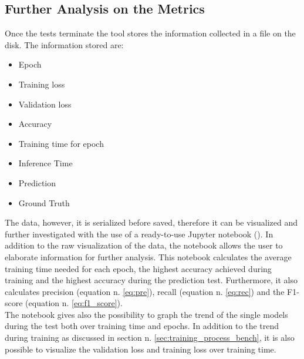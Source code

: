 \subsection{Further Analysis on the Metrics}
Once the tests terminate the tool stores the information collected in a file on the disk. The information stored are:
\begin{itemize}
\item Epoch
\item Training loss
\item Validation loss
\item Accuracy
\item Training time for epoch
\item Inference Time
\item Prediction
\item Ground Truth
\end{itemize}
The data, however, it is serialized before saved, therefore it can be visualized and further investigated with the use of a ready-to-use Jupyter notebook (\cite{Kluyver2016jupyter}). In addition to the raw visualization of the data, the notebook allows the user to elaborate information for further analysis. This notebook calculates the average training time needed for each epoch, the highest accuracy achieved during training and the highest accuracy during the prediction test.  Furthermore, it also calculates precision (equation n. \ref{eq:pre}), recall (equation n. \ref{eq:rec}) and the F1-score (equation n. \ref{eq:f1_score}). \\
The notebook gives also the possibility to graph the trend of the single models during the test both over training time and epochs. In addition to the trend during training as discussed in section n. \ref{sec:training_process_bench}, it is also possible to visualize the validation loss and training loss over training time. 
